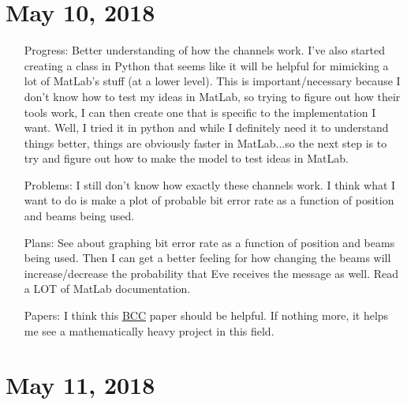 \documentclass[11pt]{article}
\begin{document}
\section{May 10, 2018}

\begin{itemize}
\item[Progress:]
Better understanding of how the channels work.  I've also started creating a class in Python that seems like it will be helpful for mimicking a lot of MatLab's stuff (at a lower level).  This is important/necessary because I don't know how to test my ideas in MatLab, so trying to figure out how their tools work, I can then create one that is specific to the implementation I want.\newline
Well, I tried it in python and while I definitely need it to understand things better, things are obviously faster in MatLab...so the next step is to try and figure out how to make the model to test ideas in MatLab.

\item[Problems:]
I still don't know how exactly these channels work.  I think what I want to do is make a plot of probable bit error rate as a function of position and beams being used.

\item[Plans:]
See about graphing bit error rate as a function of position and beams being used.  Then I can get a better feeling for how changing the beams will increase/decrease the probability that Eve receives the message as well.\newline
Read a LOT of MatLab documentation.

\item[Papers:]
I think this \href{https://ieeexplore.ieee.org/stamp/stamp.jsp?tp=&arnumber=1055892}{BCC} paper should be helpful.  If nothing more, it helps me see a mathematically heavy project in this field.

\end{itemize}

\section{May 11, 2018}
\end{document}
